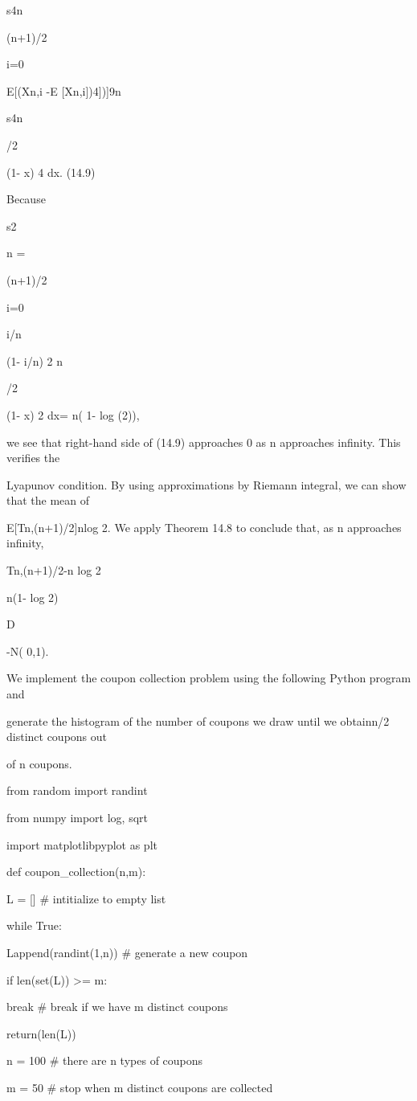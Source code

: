 s4n

(n+1)/2\sum

i=0

E[(Xn,i -E [Xn,i])4])]\leq 9n

s4n

/2

(1- x) 4 dx. (14.9)

Because

s2

n =

(n+1)/2\sum

i=0

i/n

(1- i/n) 2 n

/2

(1- x) 2 dx= n( 1- log (2)),

we see that right-hand side of (14.9) approaches 0 as n approaches infinity. This verifies the

Lyapunov condition. By using approximations by Riemann integral, we can show that the mean of

E[Tn,(n+1)/2]\to nlog 2. We apply Theorem 14.8 to conclude that, as n approaches infinity,

Tn,(n+1)/2-n log 2\sqrt

n(1- log 2)

D

-\to N( 0,1).

We implement the coupon collection problem using the following Python program and

generate the histogram of the number of coupons we draw until we obtainn/2 distinct coupons out

of n coupons.

from random import randint

from numpy import log, sqrt

import matplotlibpyplot as plt

def coupon_collection(n,m):

L = [] # intitialize to empty list

while True:

Lappend(randint(1,n)) # generate a new coupon

if len(set(L)) >= m:

break # break if we have m distinct coupons

return(len(L))

n = 100 # there are n types of coupons

m = 50 # stop when m distinct coupons are collected

